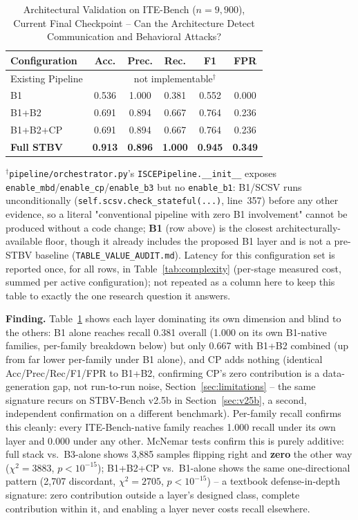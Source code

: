 \documentclass[conference]{IEEEtran}
\begin{document}
\begin{table}[t]
\centering
\caption{Architectural Validation on ITE-Bench ($n{=}9{,}900$), Current Final Checkpoint -- Can the Architecture Detect Communication and Behavioral Attacks?}
\label{tab:ite_ablation}
\footnotesize
\begin{tabular}{@{}lccccc@{}}
\toprule
Configuration & Acc. & Prec. & Rec. & F1 & FPR \\
\midrule
Existing Pipeline & \multicolumn{5}{c}{not implementable$^\dagger$} \\
B1 & 0.536 & 1.000 & 0.381 & 0.552 & 0.000 \\
B1+B2 & 0.691 & 0.894 & 0.667 & 0.764 & 0.236 \\
B1+B2+CP & 0.691 & 0.894 & 0.667 & 0.764 & 0.236 \\
\textbf{Full STBV} & \textbf{0.913} & \textbf{0.896} & \textbf{1.000} & \textbf{0.945} & \textbf{0.349} \\
\bottomrule
\end{tabular}
\par\vspace{2pt}\raggedright\footnotesize
$^\dagger$\texttt{pipeline/orchestrator.py}'s \texttt{ISCEPipeline.\_\_init\_\_} exposes \texttt{enable\_mbd}/\texttt{enable\_cp}/\texttt{enable\_b3} but no \texttt{enable\_b1}: B1/SCSV runs unconditionally (\texttt{self.scsv.check\_stateful(...)}, line~357) before any other evidence, so a literal "conventional pipeline with zero B1 involvement" cannot be produced without a code change; \textbf{B1} (row above) is the closest architecturally-available floor, though it already includes the proposed B1 layer and is not a pre-STBV baseline (\texttt{TABLE\_VALUE\_AUDIT.md}). Latency for this configuration set is reported once, for all rows, in Table~\ref{tab:complexity} (per-stage measured cost, summed per active configuration); not repeated as a column here to keep this table to exactly the one research question it answers.
\end{table}

\textbf{Finding.} Table~\ref{tab:ite_ablation} shows each layer dominating its own dimension and blind to the others: B1 alone reaches recall 0.381 overall (1.000 on its own B1-native families, per-family breakdown below) but only 0.667 with B1+B2 combined (up from far lower per-family under B1 alone), and CP adds nothing (identical Acc/Prec/Rec/F1/FPR to B1+B2, confirming CP's zero contribution is a data-generation gap, not run-to-run noise, Section~\ref{sec:limitations} -- the same signature recurs on STBV-Bench v2.5b in Section~\ref{sec:v25b}, a second, independent confirmation on a different benchmark). Per-family recall confirms this cleanly: every ITE-Bench-native family reaches 1.000 recall under its own layer and 0.000 under any other. McNemar tests confirm this is purely additive: full stack vs.\ B3-alone shows 3,885 samples flipping right and \textbf{zero} the other way ($\chi^2{=}3883$, $p{<}10^{-15}$); B1+B2+CP vs.\ B1-alone shows the same one-directional pattern (2,707 discordant, $\chi^2{=}2705$, $p{<}10^{-15}$) -- a textbook defense-in-depth signature: zero contribution outside a layer's designed class, complete contribution within it, and enabling a layer never costs recall elsewhere.
\end{document}
